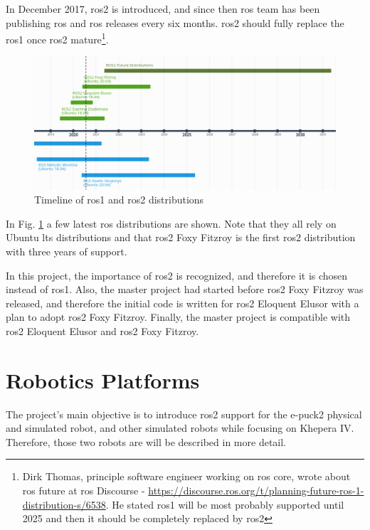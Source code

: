 In December 2017, \ac{ros2} is introduced, and since then \ac{ros} team has been publishing \ac{ros} and \ac{ros} releases every six months.
\ac{ros2} should fully replace the \ac{ros1} once \ac{ros2} mature\footnote{Dirk Thomas, principle software engineer working on \ac{ros} core, wrote about \ac{ros} future at \ac{ros} Discourse -  \url{https://discourse.ros.org/t/planning-future-ros-1-distribution-s/6538}. He stated \ac{ros1} will be most probably supported until 2025 and then it should be completely replaced by \ac{ros2}}.

\begin{figure}[H]
    \centering
    \includegraphics[width=\textwidth]{background/figures/ros_distributions.png}
    \caption{Timeline of \ac{ros1} and \ac{ros2} distributions}
    \label{fig:background:ros_distributions}
\end{figure}

In Fig. \ref{fig:background:ros_distributions} a few latest \ac{ros} distributions are shown.
Note that they all rely on Ubuntu \ac{lts} distributions and that \ac{ros2} Foxy Fitzroy is the first \ac{ros2} distribution with three years of support.

In this project, the importance of \ac{ros2} is recognized, and therefore it is chosen instead of \ac{ros1}.
Also, the master project had started before \ac{ros2} Foxy Fitzroy was released, and therefore the initial code is written for \ac{ros2} Eloquent Elusor with a plan to adopt \ac{ros2} Foxy Fitzroy.
Finally, the master project is compatible with \ac{ros2} Eloquent Elusor and \ac{ros2} Foxy Fitzroy.

\section{Robotics Platforms}
The project's main objective is to introduce \ac{ros2} support for the e-puck2 physical and simulated robot, and other simulated robots while focusing on Khepera IV.
Therefore, those two robots are will be described in more detail.

